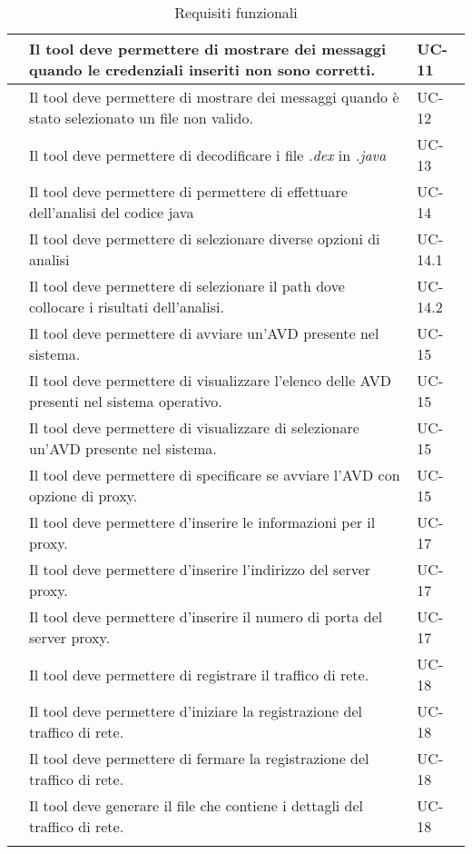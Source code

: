 \begin{center}
\begin{longtable}{ | c| C{7cm} |C{3cm} |}
        & Il tool deve permettere di mostrare dei messaggi quando le credenziali inseriti non sono corretti.& UC-11 \\\hline
        & Il tool deve permettere di mostrare dei messaggi quando è stato selezionato un file non valido.& UC-12 \\\hline
        & Il tool deve permettere di decodificare i file \textit{.dex} in \textit{.java} & UC-13\\\hline
        & Il tool deve permettere di permettere di effettuare dell'analisi del codice java& UC-14 \\\hline
        & Il tool deve permettere di selezionare diverse opzioni di analisi &UC-14.1 \\\hline
        & Il tool deve permettere di selezionare il path dove collocare i risultati dell'analisi.& UC-14.2\\\hline
        \setcounter{subCount}{0}

         & Il tool deve permettere di avviare un'AVD presente nel sistema.&UC-15\\\hline
         & Il tool deve permettere di visualizzare l'elenco delle AVD presenti nel sistema operativo.&UC-15\\\hline
         & Il tool deve permettere di visualizzare di selezionare un'AVD presente nel sistema.&UC-15\\\hline
         & Il tool deve permettere di specificare se avviare l'AVD con opzione di proxy.&UC-15\\\hline
        \setcounter{subCount}{0}
         & Il tool deve permettere d'inserire le informazioni per il proxy.&UC-17\\\hline
        & Il tool deve permettere d'inserire l'indirizzo del server proxy.&UC-17\\\hline
        & Il tool deve permettere d'inserire il numero di porta del server proxy.&UC-17\\\hline
        \setcounter{subCount}{0}
         & Il tool deve permettere di registrare il traffico di rete.&UC-18\\\hline
        & Il tool deve permettere d'iniziare la registrazione del traffico di rete.&UC-18\\\hline
        & Il tool deve permettere di fermare la registrazione del traffico di rete.&UC-18\\\hline
        & Il tool deve generare il file che contiene i dettagli del traffico di rete.&UC-18\\\hline
        \caption{Requisiti funzionali}
    \end{longtable}
\end{center}
\setcounter{rowcount}{0}

